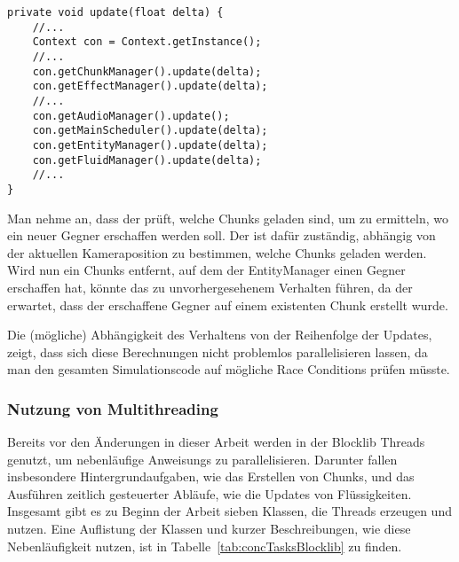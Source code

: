 \begin{lstlisting}[caption={Vereinfachte Update-Methode von \classGame{}.}, label={lst:gameUpdate},float={htbp}]
private void update(float delta) {
	//...
	Context con = Context.getInstance();
	//...
	con.getChunkManager().update(delta);
	con.getEffectManager().update(delta);
	//...
	con.getAudioManager().update();
	con.getMainScheduler().update(delta);
	con.getEntityManager().update(delta);
	con.getFluidManager().update(delta);
	//...
}
\end{lstlisting}

\begin{example}
Man nehme an, dass der \classEntityManager{} prüft, welche Chunks geladen sind, um zu ermitteln, wo ein neuer Gegner erschaffen werden soll. Der \classChunkManager{} ist dafür zuständig, abhängig von der aktuellen Kameraposition zu bestimmen, welche Chunks geladen werden. Wird nun ein Chunks entfernt, auf dem der EntityManager einen Gegner erschaffen hat, könnte das zu unvorhergesehenem Verhalten führen, da der \classEntityManager{} erwartet, dass der erschaffene Gegner auf einem existenten Chunk erstellt wurde.
\end{example}

Die (mögliche) Abhängigkeit des Verhaltens von der Reihenfolge der Updates, zeigt, dass sich diese Berechnungen nicht problemlos parallelisieren lassen, da man den gesamten Simulationscode auf mögliche Race Conditions prüfen müsste.


\subsubsection{Nutzung von Multithreading}\label{sec:nutzungMultithreading}
Bereits vor den Änderungen in dieser Arbeit werden in der Blocklib Threads genutzt, um nebenläufige \glspl{Anweisung} zu parallelisieren. Darunter fallen insbesondere Hintergrundaufgaben, wie das Erstellen von Chunks, und das Ausführen zeitlich gesteuerter Abläufe, wie die Updates von Flüssigkeiten. Insgesamt gibt es zu Beginn der Arbeit sieben Klassen, die Threads erzeugen und nutzen. Eine Auflistung der Klassen und kurzer Beschreibungen, wie diese Nebenläufigkeit nutzen, ist in Tabelle~\ref{tab:concTasksBlocklib} zu finden.

